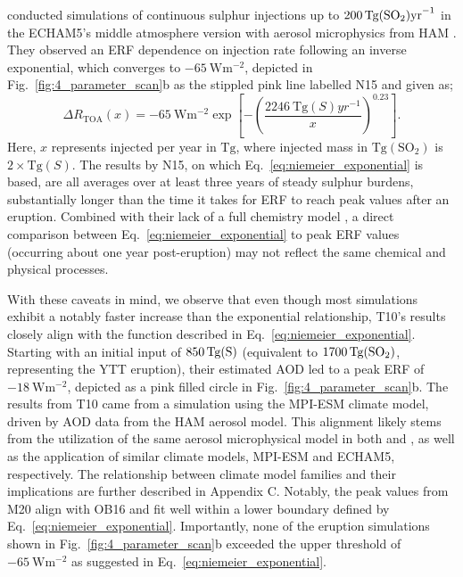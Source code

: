 \documentclass[draft]{agujournal2019}
\begin{document}
   conducted simulations of continuous sulphur injections up to
  \(\SI{200}{\tera\gram(\ce{SO2})\mathrm{yr}^{-1}}\) in the ECHAM5's middle atmosphere
  version \cite{giorgetta2006} with aerosol microphysics from HAM \cite{stier2005}. They
  observed an ERF dependence on  injection rate following an inverse
  exponential, which converges to \(\SI{-65}{\watt\meter^{-2}}\), depicted in
  Fig.~\ref{fig:4_parameter_scan}b as the stippled pink line labelled N15 and given as;
  \begin{equation}
    \Delta R_{\mathrm{TOA}}(x) = -\SI{65}{\watt\metre^{-2}}
    \exp\left[-{\left(\frac{\SI{2246}{\tera\gram(S)yr^{-1}}}{x}\right)}^{0.23}\right].
    \label{eq:niemeier_exponential}
  \end{equation}
  Here, \(x\) represents injected  per year in \(\si{\tera\gram}\), where injected
  mass in \(\si{\tera\gram(\mathrm{SO_{2}})}\) is \(2\times\si{\tera\gram(S)}\). The
  results by N15, on which Eq.~\ref{eq:niemeier_exponential} is based, are all averages
  over at least three years of steady sulphur burdens, substantially longer than the
  time it takes for ERF to reach peak values after an eruption. Combined with their lack
  of a full chemistry model \cite{niemeier2015}, a direct comparison between
  Eq.~\ref{eq:niemeier_exponential} to peak ERF values (occurring about one year
  post-eruption) may not reflect the same chemical and physical processes.

  With these caveats in mind, we observe that even though most simulations exhibit a
  notably faster increase than the exponential relationship, T10's results closely align
  with the function described in Eq.~\ref{eq:niemeier_exponential}. Starting with an
  initial input of \(\SI{850}{\tera\gram(\ce{S})}\) (equivalent to
  \(\SI{1700}{\tera\gram(\ce{SO2})}\), representing the YTT eruption), their estimated
  AOD led to a peak ERF of \(\SI{-18}{\watt\meter^{-2}}\), depicted as a pink filled
  circle in Fig.~\ref{fig:4_parameter_scan}b. The results from T10 came from a
  simulation using the MPI-ESM climate model, driven by AOD data from the HAM aerosol
  model. This alignment likely stems from the utilization of the same aerosol
  microphysical model in both  and , as well as
  the application of similar climate models, MPI-ESM and ECHAM5, respectively. The
  relationship between climate model families and their implications are further
  described in Appendix C. Notably, the peak values from M20 align with OB16 and fit
  well within a lower boundary defined by Eq.~\ref{eq:niemeier_exponential}.
  Importantly, none of the eruption simulations shown in
  Fig.~\ref{fig:4_parameter_scan}b exceeded the upper threshold of
  \(\SI{-65}{\watt\meter^{-2}}\) as suggested in Eq.~\ref{eq:niemeier_exponential}.
\end{document}
